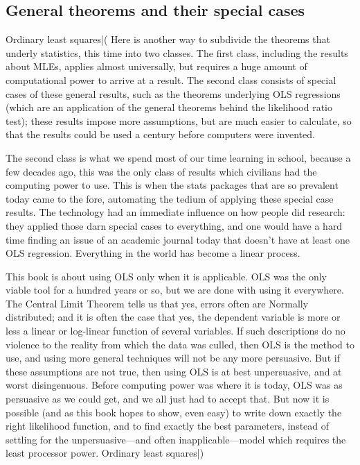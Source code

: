 \documentclass[12pt,notitlepage, openany]{book}
\def\ind#1{\index{#1}#1}
\begin{document}
\subsection{General theorems and their special cases}\ind{Ordinary least
squares|(}
Here is another way to subdivide the theorems that underly
statistics, this time into two classes. The first class, including the
results about MLEs, applies almost universally, but requires a huge
amount of computational power to arrive at a result. The second class
consists of special cases of these general results, such as the theorems
underlying OLS regressions (which are an application of the general
theorems behind the likelihood ratio test); these results impose more
assumptions, but are much easier to calculate, so that the results could
be used a century before computers were invented.

The second class is what we spend most of our time learning in school,
because a few decades ago, this was the only class of results which
civilians had the computing power to use. This is when the stats packages
that are so prevalent today came to the fore, automating the tedium of
applying these special case results. The technology had an immediate
influence on how people did research: they applied those darn special
cases to everything, and one would have a hard time finding an issue of an
academic journal today that doesn't have at least one OLS regression.
Everything in the world has become a linear process.

This book is about using OLS only when it is applicable. OLS was the only
viable tool for a hundred years or so, but we are done with using it everywhere.
The Central Limit Theorem tells us that yes, errors often are
Normally distributed; and it is often the case that yes, the dependent
variable is more or less a linear or log-linear function of several
variables. If such descriptions do no violence to the reality from
which the data was culled, then OLS is the method to use, and using
more general techniques will not be any more persuasive. But if these
assumptions are not true, then using OLS is at best unpersuasive, and at
worst disingenuous. Before computing power was where it is today, OLS was
as persuasive as we could get, and we all just had to accept that. But
now it is possible (and as this book hopes to show, even easy) to write
down exactly the right likelihood function, and to find exactly the best
parameters, instead of settling for the unpersuasive---and often
inapplicable---model which requires the least processor power.
\ind{Ordinary least squares|)}
\end{document}
